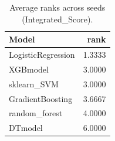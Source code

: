 \begin{table}[t]
\centering
\begin{tabular}{lr}
\toprule
Model & rank \\
\midrule
LogisticRegression & 1.3333 \\
XGBmodel & 3.0000 \\
sklearn_SVM & 3.0000 \\
GradientBoosting & 3.6667 \\
random_forest & 4.0000 \\
DTmodel & 6.0000 \\
\bottomrule
\end{tabular}
\caption{Average ranks across seeds (Integrated_Score).}
\label{tab:avg_rank_Integrated_Score}
\end{table}